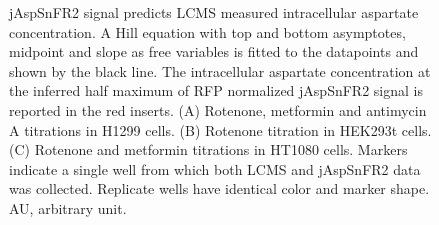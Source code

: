 \documentclass[9pt,lineno]{elife}
\begin{document}
\begin{figure}[ht!]
\centering
{}
\caption{
jAspSnFR2 signal predicts LCMS measured intracellular aspartate concentration.
A Hill equation with top and bottom asymptotes, midpoint and slope as free variables is fitted to the datapoints and shown by the black line.
The intracellular aspartate concentration at the inferred half maximum of RFP normalized jAspSnFR2 signal is reported in the red inserts.
(A) Rotenone, metformin and antimycin A titrations in H1299 cells.
(B) Rotenone titration in HEK293t cells.
(C) Rotenone and metformin titrations in HT1080 cells.
Markers indicate a single well from which both LCMS and jAspSnFR2 data was collected.
Replicate wells have identical color and marker shape.
AU, arbitrary unit.
}
\label{fig:Fig3}
\label{figsupp:f3S1}
\end{figure}
\end{document}
